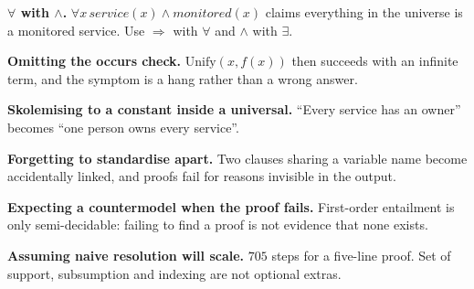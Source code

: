 \begin{pitfall}
\begin{tight}
  \item \textbf{$\forall$ with $\wedge$.}
        $\forall x\, \mathit{service}(x) \wedge \mathit{monitored}(x)$ claims
        everything in the universe is a monitored service. Use $\Rightarrow$ with
        $\forall$ and $\wedge$ with $\exists$.
  \item \textbf{Omitting the occurs check.} $\mathrm{Unify}(x, f(x))$ then
        succeeds with an infinite term, and the symptom is a hang rather than a
        wrong answer.
  \item \textbf{Skolemising to a constant inside a universal.} ``Every service has
        an owner'' becomes ``one person owns every service''.
  \item \textbf{Forgetting to standardise apart.} Two clauses sharing a variable
        name become accidentally linked, and proofs fail for reasons invisible in
        the output.
  \item \textbf{Expecting a countermodel when the proof fails.} First-order
        entailment is only semi-decidable: failing to find a proof is not evidence
        that none exists.
  \item \textbf{Assuming naive resolution will scale.} $705$ steps for a five-line
        proof. Set of support, subsumption and indexing are not optional extras.
\end{tight}
\end{pitfall}


